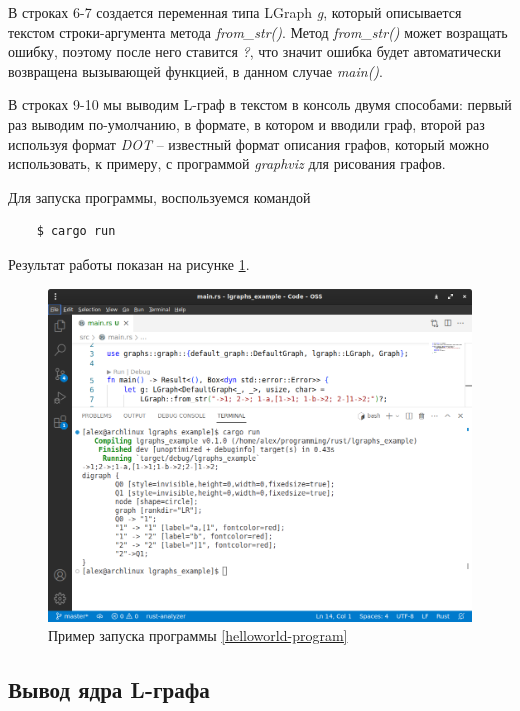 В строках 6-7 создается переменная типа LGraph \emph{g}, который описывается текстом строки-аргумента
метода \emph{from\_str()}. Метод \emph{from\_str()} может возращать ошибку, поэтому после него ставится \emph{?}, 
что значит ошибка будет автоматически возвращена вызывающей функцией, в данном случае \emph{main()}.

В строках 9-10 мы выводим L-граф в текстом в консоль двумя способами: первый раз выводим по-умолчанию,
в формате, в котором и вводили граф, второй раз используя формат \emph{DOT} -- известный формат описания графов,
который можно использовать, к примеру, с программой \emph{graphviz} для рисования графов. 

Для запуска программы, воспользуемся командой
\begin{verbatim}
    $ cargo run
\end{verbatim}
Результат работы показан на рисунке \ref{helloworld-out-image}.

\begin{figure}
    \centering
    \includegraphics[scale=0.4]{static_images/hello_world.png}
    \caption{Пример запуска программы \ref{helloworld-program}}
    \label{helloworld-out-image}
\end{figure}

\subsection{Вывод ядра L-графа}

\inputminted[linenos]{rust}{../lgraphs/examples/core11.rs} \label{core11-program}

